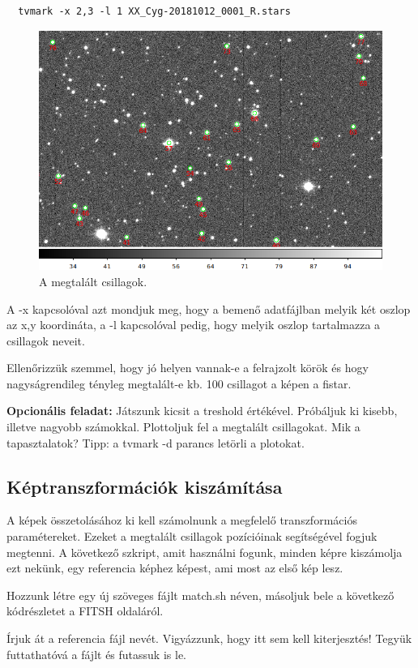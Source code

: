 \documentclass{article}
\begin{document}
\begin{verbatim}
  tvmark -x 2,3 -l 1 XX_Cyg-20181012_0001_R.stars
\end{verbatim}

\begin{figure}
    \centering
    \includegraphics[width=0.8\linewidth]{pics/tvmark.png}
    \caption{A megtalált csillagok.}
    \label{stars}
\end{figure}

A -x kapcsolóval azt mondjuk meg, hogy a bemenő adatfájlban melyik két oszlop
az x,y koordináta, a -l kapcsolóval pedig, hogy melyik oszlop tartalmazza a
csillagok neveit.

Ellenőrizzük szemmel, hogy jó helyen vannak-e a felrajzolt körök és hogy
nagyságrendileg tényleg megtalált-e kb. 100 csillagot a képen a fistar.

{\bf Opcionális feladat:}
Játszunk kicsit a treshold értékével. Próbáljuk ki kisebb, illetve nagyobb
számokkal. Plottoljuk fel a megtalált csillagokat. Mik a tapasztalatok?
Tipp: a tvmark -d parancs letörli a plotokat.

\subsection{Képtranszformációk kiszámítása}

A képek összetolásához ki kell számolnunk a megfelelő transzformációs
paramétereket. Ezeket a megtalált csillagok pozícióinak segítségével fogjuk
megtenni. A következő szkript, amit használni fogunk, minden képre kiszámolja
ezt nekünk, egy referencia képhez képest, ami most az első kép lesz.

Hozzunk létre egy új szöveges fájlt match.sh néven, másoljuk bele a következő
kódrészletet a FITSH oldaláról.

Írjuk át a referencia fájl nevét. Vigyázzunk, hogy itt sem kell kiterjesztés!
Tegyük futtathatóvá a fájlt és futassuk is le.
\end{document}

